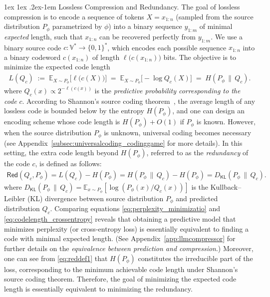 \documentclass[11pt]{article}
\makeatletter
\theoremstyle{plain}
\theoremstyle{definition}
\renewcommand{\paragraph}{%
  \@startsection{paragraph}{4}%
  {\z@}{1ex \@plus 1ex \@minus .2ex}{-1em}%
  {\normalfont\normalsize\bfseries}%
}
\newcommand{\tokenset}{\mathbb{V}}
\newcommand{\DKL}{D_{\mathsf{KL}}}
\newcommand{\redundency}{\mathsf{Red}}
\newcommand{\crossentropy}{H}
\newcommand{\codelength}{L}
\makeatother
\begin{document}
\paragraph{Lossless Compression and Redundancy.}
The goal of lossless compression is to encode a sequence of tokens 
\(X=\displaystyle x_{1:n}\) (sampled from the source distribution $P_{\phi}$ parametrized by
\(\displaystyle \phi\)) into a binary sequence \(\displaystyle y_{1:m}\) of 
minimal \emph{expected} length, such that \(\displaystyle x_{1:n}\) can be 
recovered perfectly from \(\displaystyle y_{1:m}\). We use a binary source 
code \(\displaystyle c : \tokenset^* \to \{0, 1\}^*\), 
which encodes each possible 
sequence \(\displaystyle x_{1:n}\) into a binary codeword 
\(\displaystyle c(x_{1:n})\) of length \(\displaystyle \ell\bigl(c(x_{1:n})\bigr)\) bits. 
The objective is to minimize the expected code length
\begin{align}
\label{eq:codelength_crossentropy}
    \codelength(Q_c) \;:=\; 
    \mathbb{E}_{X \sim P_{\phi}}\bigl[\ell\bigl(c(X)\bigr)\bigr]
    \;=\; 
    \mathbb{E}_{X \sim P_{\phi}}\bigl[-\log Q_c(X)\bigr]
    \;=\; 
    \crossentropy(P_{\phi}\,\|\, Q_c).
\end{align}
where $Q_c(x) \propto 2^{-\ell(c(x))}$ is the {\em predictive probability corresponding to the code} $c$.
According to Shannon's source coding theorem~\cite{Shannon1948}, the average length of any lossless code is bounded below by the entropy \(H(P_\phi)\), and one can design an encoding scheme whose code length is \(H(P_\phi) + O(1)\) if $P_\phi$ is known. However, when the source distribution \(P_\phi\) is unknown, universal coding becomes necessary (see Appendix~\ref{subsec:universalcoding_codinggame} for more details). In this setting, the extra code length beyond \(H(P_\phi)\), referred to as the {\em redundancy} of the code \(c\), is defined as follows:
\begin{align}
\label{eq:reddef1}
    \redundency(Q_c, P_\phi) 
    = L(Q_c)-H(P_\phi) 
     = \crossentropy(P_\phi\,\|\,Q_c)-H(P_\phi) 
    = \DKL(P_\phi\,\|\,Q_c).
\end{align}
where $\DKL(P_{\phi}\,\|\,Q_c)
=\mathbb{E}_{x\sim P_{\phi}}\left[\log (P_{\phi}(x)/Q_c(x)) \right]$ is the Kullback–Leibler (KL) divergence between source distribution $P_{\phi}$ and predicted distribution $Q_c$.
Comparing equations \eqref{eq:perplexity_minimizatio} and \eqref{eq:codelength_crossentropy} reveals that obtaining a predictive model that minimizes perplexity (or cross-entropy loss) is essentially equivalent to finding a code with minimal expected length. (See Appendix~\ref{app:llmcompressor} for further details on the {\em equivalence between prediction and compression}.) Moreover, one can see from  \eqref{eq:reddef1} that \(H(P_\phi)\) constitutes the irreducible part of the loss, corresponding to the minimum achievable code length under Shannon’s source coding theorem. Therefore, the goal of minimizing the expected code length is essentially equivalent to minimizing the redundancy.
\end{document}

